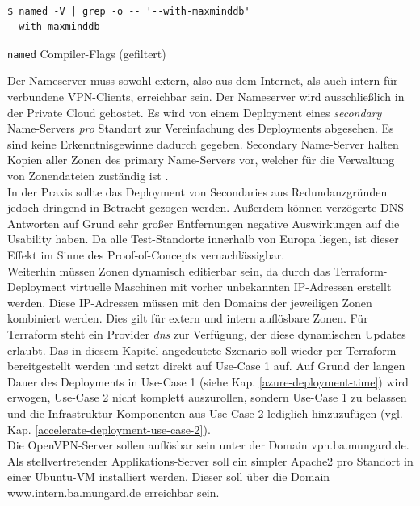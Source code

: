 \begin{listing}[h]
\begin{verbatim}

$ named -V | grep -o -- '--with-maxminddb'
--with-maxminddb

\end{verbatim}
\caption{\texttt{named} Compiler-Flags (gefiltert)}
\label{bind-mmdb-compiler-flag}
\end{listing}
Der Nameserver muss sowohl extern, also aus dem Internet, als auch intern für verbundene VPN-\gls{Client}s, erreichbar sein. Der Nameserver wird ausschließlich in der Private Cloud gehostet. Es wird von einem \gls{Deployment} eines \textit{secondary} Name-Servers \textit{pro} Standort zur Vereinfachung des \gls{Deployment}s abgesehen. Es sind keine Erkenntnisgewinne dadurch gegeben. Secondary Name-Server halten Kopien aller Zonen des primary Name-Servers vor, welcher für die Verwaltung von Zonendateien zuständig ist \cite[S.517]{Fall2011}.\\
In der Praxis sollte das \gls{Deployment} von \glqq Secondaries\grqq{} aus Redundanzgründen jedoch dringend in Betracht gezogen werden. Außerdem können \glqq verzögerte\grqq{} \gls{DNS}-Antworten auf Grund sehr großer Entfernungen negative Auswirkungen auf die Usability haben. Da alle Test-Standorte innerhalb von Europa liegen, ist dieser Effekt im Sinne des Proof-of-Concepts vernachlässigbar.\\
Weiterhin müssen Zonen dynamisch editierbar sein, da durch das Terraform-\gls{Deployment} virtuelle Maschinen mit vorher unbekannten IP-Adressen erstellt werden. Diese IP-Adressen müssen mit den Domains der jeweiligen Zonen kombiniert werden. Dies gilt für extern und intern auflösbare Zonen. Für Terraform steht ein Provider \textit{dns} zur Verfügung, der diese dynamischen Updates erlaubt\cite{dnstf2021}.
Das in diesem Kapitel angedeutete Szenario soll wieder per Terraform bereitgestellt werden und setzt direkt auf Use-Case 1 auf. Auf Grund der langen Dauer des \gls{Deployment}s in Use-Case 1 (siehe Kap. \ref{azure-deployment-time}) wird erwogen, Use-Case 2 nicht \glqq komplett\grqq{} auszurollen, sondern Use-Case 1 zu belassen und die Infrastruktur-Komponenten aus Use-Case 2 lediglich hinzuzufügen (vgl. Kap. \ref{accelerate-deployment-use-case-2}).\\
Die OpenVPN-Server sollen auflösbar sein unter der Domain vpn.ba.mungard.de.\\
Als stellvertretender \glqq Applikations-Server\grqq{} soll ein simpler Apache2 pro Standort in einer Ubuntu-\gls{VM} installiert werden. Dieser soll über die Domain www.intern.ba.mungard.de erreichbar sein.
